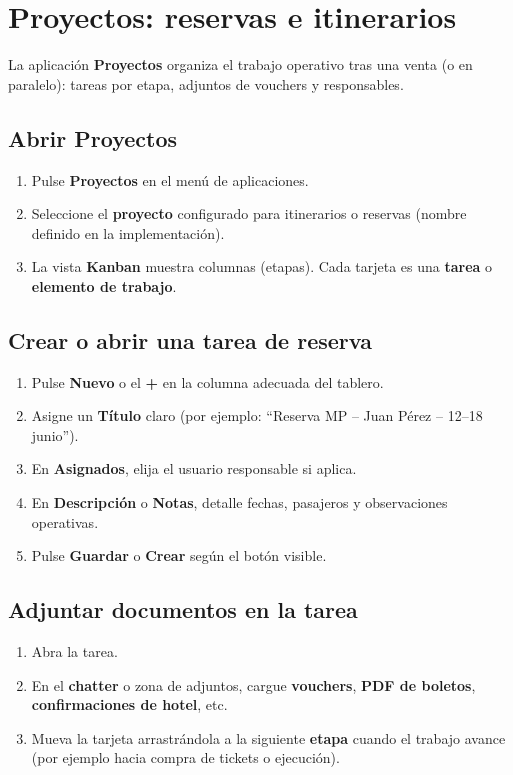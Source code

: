 \section{Proyectos: reservas e itinerarios}

La aplicación \textbf{Proyectos} organiza el trabajo operativo tras una venta (o en paralelo): tareas por etapa, adjuntos de vouchers y responsables.

\subsection{Abrir Proyectos}

\begin{enumerate}
    \item Pulse \textbf{Proyectos} en el menú de aplicaciones.
    \item Seleccione el \textbf{proyecto} configurado para itinerarios o reservas (nombre definido en la implementación).
    \item La vista \textbf{Kanban} muestra columnas (etapas). Cada tarjeta es una \textbf{tarea} o \textbf{elemento de trabajo}.
\end{enumerate}

\subsection{Crear o abrir una tarea de reserva}

\begin{enumerate}
    \item Pulse \textbf{Nuevo} o el \textbf{+} en la columna adecuada del tablero.
    \item Asigne un \textbf{Título} claro (por ejemplo: ``Reserva MP -- Juan Pérez -- 12--18 junio'').
    \item En \textbf{Asignados}, elija el usuario responsable si aplica.
    \item En \textbf{Descripción} o \textbf{Notas}, detalle fechas, pasajeros y observaciones operativas.
    \item Pulse \textbf{Guardar} o \textbf{Crear} según el botón visible.
\end{enumerate}

\subsection{Adjuntar documentos en la tarea}

\begin{enumerate}
    \item Abra la tarea.
    \item En el \textbf{chatter} o zona de adjuntos, cargue \textbf{vouchers}, \textbf{PDF de boletos}, \textbf{confirmaciones de hotel}, etc.
    \item Mueva la tarjeta arrastrándola a la siguiente \textbf{etapa} cuando el trabajo avance (por ejemplo hacia compra de tickets o ejecución).
\end{enumerate}

